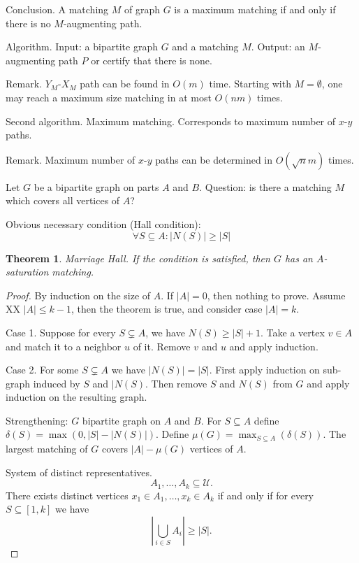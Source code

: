 \documentclass[12pt,a4paper]{article}
\newtheorem{theorem}{Theorem}
\begin{document}
Conclusion.  A matching \(M\) of graph \(G\) is a maximum matching if and only
if there is no \(M\)-augmenting path.

Algorithm.  Input: a bipartite graph \(G\) and a matching \(M\).  Output: an
\(M\)-augmenting path \(P\) or certify that there is none.

Remark.  \(Y_M\)-\(X_M\) path can be found in \(O(m)\) time.  Starting with
\(M=\emptyset\), one may reach a maximum size matching in at most \(O(n m)\)
times.

Second algorithm.  Maximum matching.  Corresponds to maximum number of
\(x\)-\(y\) paths.

Remark.  Maximum number of \(x\)-\(y\) paths can be determined in \(O(\sqrt{n}
m)\) times.

Let \(G\) be a bipartite graph on parts \(A\) and \(B\).  Question: is there a
matching \(M\) which covers all vertices of \(A\)?

Obvious necessary condition (Hall condition):
\[\forall S \subseteq A: |N(S)| \geq |S|\]

\begin{theorem}
  Marriage Hall.  If the condition is satisfied, then \(G\) has an
  \(A\)-saturation matching.
\end{theorem}

\begin{proof}
  By induction on the size of \(A\).  If \(|A| = 0\), then nothing to prove.
  Assume XX \(|A| \leq k -1\), then the theorem is true, and consider case
  \(|A| = k\).

  Case 1. Suppose for every \(S \subsetneq A\), we have \(N(S) \geq |S|+1\).
  Take a vertex \(v \in A\) and match it to a neighbor \(u\) of it.  Remove
  \(v\) and \(u\) and apply induction.

  Case 2. For some \(S \subsetneq A\) we have \(|N(S)| = |S|\).  First apply
  induction on sub-graph induced by \(S\) and \(|N(S)\).  Then remove \(S\) and
  \(N(S)\) from \(G\) and apply induction on the resulting graph.

  Strengthening: \(G\) bipartite graph on \(A\) and \(B\).  For
  \(S \subseteq A\) define \(\delta(S) = \max(0, |S| - |N(S)|)\).  Define
  \(\mu(G) = \max_{S \subseteq A}(\delta(S))\).  The largest matching of \(G\)
  covers \(|A| - \mu(G)\) vertices of \(A\).

  System of distinct representatives. \[A_1, \dots, A_k \subseteq \mathcal{U}.\]
  There exists distinct vertices \(x_1 \in A_1, \dots, x_k \in A_k\) if and only
  if for every \(S \subseteq [1, k]\) we have
  \[\left| \bigcup_{i \in S} A_i \right| \geq |S|.\]
\end{proof}
\end{document}
